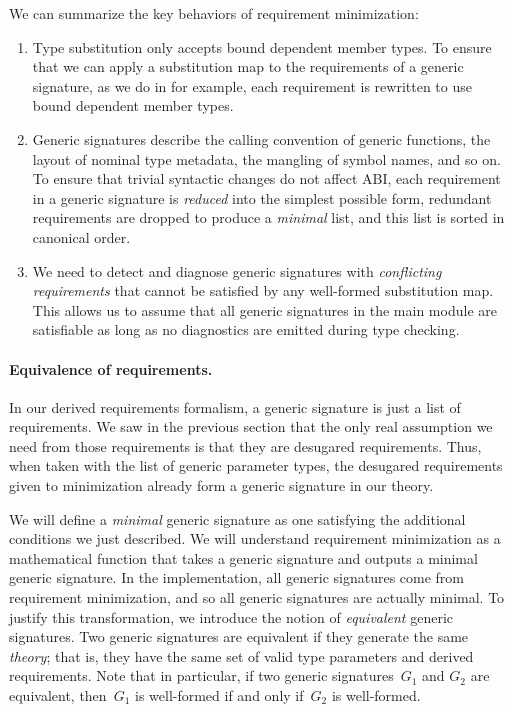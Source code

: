 \documentclass[../generics]{subfiles}
\begin{document}
We can summarize the key behaviors of requirement minimization:
\begin{enumerate}
\item
Type substitution only accepts bound dependent member types. To ensure that we can apply a substitution map to the requirements of a generic signature, as we do in  for example, each requirement is rewritten to use bound dependent member types.

\item Generic signatures describe the calling convention of generic functions, the layout of nominal type metadata, the mangling of symbol names, and so on. To ensure that trivial syntactic changes do not affect ABI, each requirement in a generic signature is \emph{reduced} into the simplest possible form, redundant requirements are dropped to produce a \emph{minimal} list, and this list is sorted in canonical order.

\item We need to detect and diagnose generic signatures with \emph{conflicting requirements} that cannot be satisfied by any well-formed substitution map. This allows us to assume that all generic signatures in the main module are satisfiable as long as no diagnostics are emitted during type checking.
\end{enumerate}

\paragraph{Equivalence of requirements.} In our derived requirements formalism, a generic signature is just a list of requirements. We saw in the previous section that the only real assumption we need from those requirements is that they are desugared requirements. Thus, when taken with the list of generic parameter types, the desugared requirements given to minimization already form a generic signature in our theory. 

We will define a \emph{minimal} generic signature as one satisfying the additional conditions we just described. We will understand requirement minimization as a mathematical function that takes a generic signature and outputs a minimal generic signature. In the implementation, all generic signatures come from requirement minimization, and so all generic signatures are actually minimal. To justify this transformation, we introduce the notion of \emph{equivalent} generic signatures. Two generic signatures are equivalent if they generate the same \emph{theory}; that is, they have the same set of valid type parameters and derived requirements. Note that in particular, if two generic signatures~$G_1$ and $G_2$ are equivalent, then~$G_1$ is well-formed if and only if~$G_2$ is well-formed.
\end{document}

